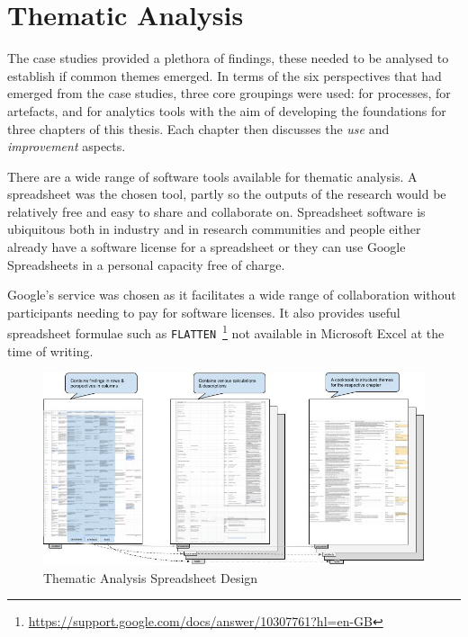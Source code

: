 \chapter{Thematic Analysis}
\label{appendix-thematic-analysis}

The case studies provided a plethora of findings, these needed to be analysed to establish if common themes emerged. In terms of the six perspectives that had emerged from the case studies, three core groupings were used: for processes, for artefacts, and for analytics tools with the aim of developing the foundations for three chapters of this thesis. Each chapter then discusses the \textit{use} and \textit{improvement} aspects.

There are a wide range of software tools available for thematic analysis. A spreadsheet was the chosen tool, partly so the outputs of the research would be relatively free and easy to share and collaborate on. Spreadsheet software is ubiquitous both in industry and in research communities and people either already have a software license for a spreadsheet or they can use Google Spreadsheets in a personal capacity free of charge.  

Google's service was chosen as it facilitates a wide range of collaboration without participants needing to pay for software licenses. It also provides useful spreadsheet formulae such as \texttt{FLATTEN}~\footnote{\url{https://support.google.com/docs/answer/10307761?hl=en-GB}} not available in Microsoft Excel at the time of writing.

\begin{figure}
    \centering
    \includegraphics[width=\textwidth]{images/my/Thematic-Analysis-Spreadsheet-Design-28-may-2022a.jpeg}
    \caption{Thematic Analysis Spreadsheet Design}
    \label{fig:thematic-analysis-spreadsheet-design}
\end{figure}

